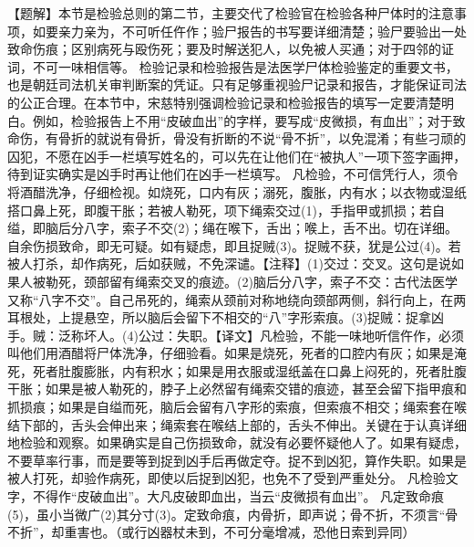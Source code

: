 \documentclass[12pt,UTF8]{ctexbook}
\begin{document}
【题解】本节是检验总则的第二节，主要交代了检验官在检验各种尸体时的注意事项，如要亲力亲为，不可听任仵作；验尸报告的书写要详细清楚；验尸要验出一处致命伤痕；区别病死与殴伤死；要及时解送犯人，以免被人买通；对于四邻的证词，不可一味相信等。
检验记录和检验报告是法医学尸体检验鉴定的重要文书，也是朝廷司法机关审判断案的凭证。只有足够重视验尸记录和报告，才能保证司法的公正合理。在本节中，宋慈特别强调检验记录和检验报告的填写一定要清楚明白。例如，检验报告上不用“皮破血出”的字样，要写成“皮微损，有血出”；对于致命伤，有骨折的就说有骨折，骨没有折断的不说“骨不折”，以免混淆；有些刁顽的囚犯，不愿在凶手一栏填写姓名的，可以先在让他们在“被执人”一项下签字画押，待到证实确实是凶手时再让他们在凶手一栏填写。
凡检验，不可信凭行人，须令将酒醋洗净，仔细检视。如烧死，口内有灰；溺死，腹胀，内有水；以衣物或湿纸搭口鼻上死，即腹干胀；若被人勒死，项下绳索交过(1)，手指甲或抓损；若自缢，即脑后分八字，索子不交(2)；绳在喉下，舌出；喉上，舌不出。切在详细。自余伤损致命，即无可疑。如有疑虑，即且捉贼(3)。捉贼不获，犹是公过(4)。若被人打杀，却作病死，后如获贼，不免深谴。【注释】(1)交过：交叉。这句是说如果人被勒死，颈部留有绳索交叉的痕迹。(2)脑后分八字，索子不交：古代法医学又称“八字不交”。自己吊死的，绳索从颈前对称地绕向颈部两侧，斜行向上，在两耳根处，上提悬空，所以脑后会留下不相交的“八”字形索痕。(3)捉贼：捉拿凶手。贼：泛称坏人。(4)公过：失职。【译文】凡检验，不能一味地听信仵作，必须叫他们用酒醋将尸体洗净，仔细验看。如果是烧死，死者的口腔内有灰；如果是淹死，死者肚腹膨胀，内有积水；如果是用衣服或湿纸盖在口鼻上闷死的，死者肚腹干胀；如果是被人勒死的，脖子上必然留有绳索交错的痕迹，甚至会留下指甲痕和抓损痕；如果是自缢而死，脑后会留有八字形的索痕，但索痕不相交；绳索套在喉结下部的，舌头会伸出来；绳索套在喉结上部的，舌头不伸出。关键在于认真详细地检验和观察。如果确实是自己伤损致命，就没有必要怀疑他人了。如果有疑虑，不要草率行事，而是要等到捉到凶手后再做定夺。捉不到凶犯，算作失职。如果是被人打死，却验作病死，即使以后捉到凶犯，也免不了受到严重处分。
凡检验文字，不得作“皮破血出”。大凡皮破即血出，当云“皮微损有血出”。
凡定致命痕(5)，虽小当微广(2)其分寸(3)。定致命痕，内骨折，即声说；骨不折，不须言“骨不折”，却重害也。（或行凶器杖未到，不可分毫增减，恐他日索到异同）
\end{document}
